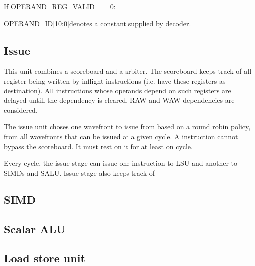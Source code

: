 \documentclass{article}
\begin{document}
\begin{description}
\begin{description}
  \item If  OPERAND\_REG\_VALID == 0:
    \begin{description}
    \item OPERAND\_ID[10:0]denotes a constant supplied by decoder.
    \end{description}

  \end{description}
  
\end{description}

\subsection{Issue}
This unit combines a scoreboard and a arbiter. The scoreboard keeps track of all register being written by inflight instructions (i.e. have these registers as destination). All instructions whose operands depend on such registers are delayed untill the dependency is cleared. RAW and WAW dependencies are considered.

The issue unit choses one wavefront to issue from based on a round robin policy, from all wavefronts that can be issued at a given cycle. A instruction cannot bypass the scoreboard. It must rest on it for at least on cycle.

Every cycle, the issue stage can issue one instruction to LSU and another to SIMDs and SALU. Issue stage also keeps track of 

\subsection{SIMD}
\subsection{Scalar ALU}
\subsection{Load store unit}
\end{document}

